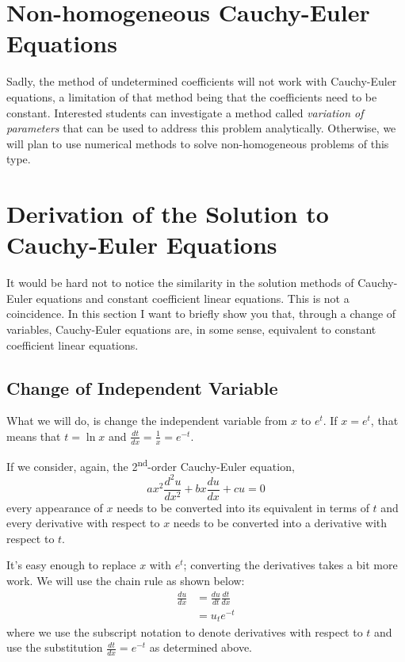 \begin{enumerate}
\end{enumerate}

\section{Non-homogeneous Cauchy-Euler Equations}
Sadly, the method of undetermined coefficients will not work with Cauchy-Euler equations, a limitation of that method being that the coefficients need to be constant. Interested students can investigate a method called \emph{variation of parameters} that can be used to address this problem analytically.  Otherwise, we will plan to use numerical methods to solve non-homogeneous problems of this type.

\section{Derivation of the Solution to Cauchy-Euler Equations}
It would be hard not to notice the similarity in the solution methods of Cauchy-Euler equations and constant coefficient linear equations.  This is not a coincidence.  In this section I want to briefly show you that, through a change of variables, Cauchy-Euler equations are, in some sense, equivalent to constant coefficient linear equations.

\subsection{Change of Independent Variable}
What we will do, is change the independent variable from $x$ to $e^t$.  If $x = e^t$, that means that $t = \ln{x}$ and $\frac{dt}{dx} = \frac{1}{x} = e^{-t}$.

If we consider, again, the 2\textsuperscript{nd}-order Cauchy-Euler equation,
\begin{equation*}
ax^2\frac{d^2u}{dx^2}+bx\frac{du}{dx}+cu = 0
\end{equation*}
every appearance of $x$ needs to be converted into its equivalent in terms of $t$ and every derivative with respect to $x$ needs to be converted into a derivative with respect to $t$.

It's easy enough to replace $x$ with $e^t$; converting the derivatives takes a bit more work.  We will use the chain rule as shown below:
\begin{align*}
\frac{du}{dx} &= \frac{du}{dt} \frac{dt}{dx} \\
&=u_t e^{-t}
\end{align*}
where we use the subscript notation to denote derivatives with respect to $t$ and use the substitution $\frac{dt}{dx}=e^{-t}$ as determined above.

